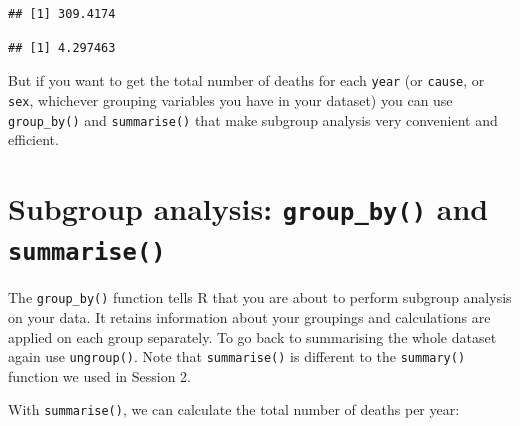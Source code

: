 \documentclass[]{book}
\makeatletter
\newenvironment{Shaded}{\begin{snugshade}}{\end{snugshade}}
\newcommand{\KeywordTok}[1]{\textcolor[rgb]{0.13,0.29,0.53}{\textbf{#1}}}
\newcommand{\DataTypeTok}[1]{\textcolor[rgb]{0.13,0.29,0.53}{#1}}
\newcommand{\StringTok}[1]{\textcolor[rgb]{0.31,0.60,0.02}{#1}}
\newcommand{\OperatorTok}[1]{\textcolor[rgb]{0.81,0.36,0.00}{\textbf{#1}}}
\newcommand{\NormalTok}[1]{#1}
\newenvironment{kframe}{%
\medskip{}
\setlength{\fboxsep}{.8em}
 \def\at@end@of@kframe{}%
 \ifinner\ifhmode%
  \def\at@end@of@kframe{\end{minipage}}%
  \begin{minipage}{\columnwidth}%
 \fi\fi%
 \def\FrameCommand##1{\hskip\@totalleftmargin \hskip-\fboxsep
 \colorbox{shadecolor}{##1}\hskip-\fboxsep
     \hskip-\linewidth \hskip-\@totalleftmargin \hskip\columnwidth}%
 \MakeFramed {\advance\hsize-\width
   \@totalleftmargin\z@ \linewidth\hsize
   \@setminipage}}%
 {\par\unskip\endMakeFramed%
 \at@end@of@kframe}
\renewenvironment{Shaded}{\begin{kframe}}{\end{kframe}}
\makeatother
\begin{document}
\begin{verbatim}
## [1] 309.4174
\end{verbatim}

\begin{Shaded}
\end{Shaded}

\begin{verbatim}
## [1] 4.297463
\end{verbatim}

But if you want to get the total number of deaths for each \texttt{year}
(or \texttt{cause}, or \texttt{sex}, whichever grouping variables you
have in your dataset) you can use \texttt{group\_by()} and
\texttt{summarise()} that make subgroup analysis very convenient and
efficient.

\section{\texorpdfstring{Subgroup analysis: \texttt{group\_by()} and
\texttt{summarise()}}{Subgroup analysis: group\_by() and summarise()}}\label{subgroup-analysis-group_by-and-summarise}

The \texttt{group\_by()} function tells R that you are about to perform
subgroup analysis on your data. It retains information about your
groupings and calculations are applied on each group separately. To go
back to summarising the whole dataset again use \texttt{ungroup()}. Note
that \texttt{summarise()} is different to the \texttt{summary()}
function we used in Session 2.

With \texttt{summarise()}, we can calculate the total number of deaths
per year:

\begin{Shaded}
\end{Shaded}
\end{document}
